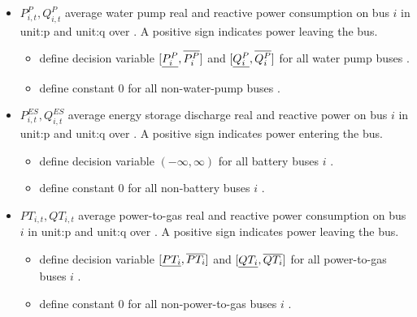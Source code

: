 \begin{itemize}
\item $P^P_{i,t}, Q^P_{i,t}$ average water pump real and reactive power
  consumption on bus $i$ in \gls{unit:p} and \gls{unit:q} over \intervaloft{}. A
  positive sign indicates power leaving the
  bus.  \begin{itemize} \item \gls{define} decision variable
  $[\underline{P^P_i}, \overline{P^P_i}]$ and $[\underline{Q^P_i}, \overline{Q^P_i}]$ for all water pump
  buses \atallt{}.  \item \gls{define} constant 0 for all non-water-pump
  buses \atallt{}.  \end{itemize}

\item $P^{ES}_{i,t}, Q^{ES}_{i,t}$ average energy storage discharge real and
  reactive power on bus $i$ in \gls{unit:p} and \gls{unit:q}
  over \intervaloft{}. A positive sign indicates power entering the
  bus.  \begin{itemize} \item \gls{define} decision variable $(-\infty, \infty)$
  for all battery buses $i$ \atallt{}.  \item \gls{define} constant $0$ for all
  non-battery buses $i$ \atallt{}.  \end{itemize}

\item $PT_{i,t}, QT_{i,t}$ average power-to-gas real and reactive power
  consumption on bus $i$ in \gls{unit:p} and \gls{unit:q} over \intervaloft{}. A
  positive sign indicates power leaving the
  bus.  \begin{itemize} \item \gls{define} decision variable
  $[\underline{PT_i}, \overline{PT_i}]$ and $[\underline{QT_i}, \overline{QT_i}]$ for all power-to-gas
  buses $i$ \atallt{}.  \item \gls{define} constant $0$ for all non-power-to-gas
  buses $i$ \atallt{}.  \end{itemize}

\end{itemize}
